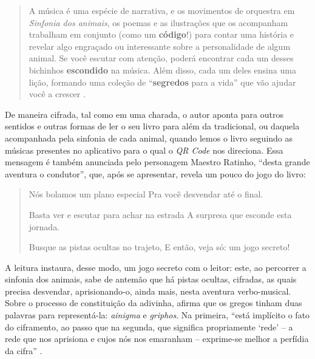 \documentclass[portuguese]{textolivre}
\begin{document}
\begin{quote}
A música é uma espécie de narrativa, e os movimentos de orquestra em
\textit{Sinfonia dos animais}, os poemas e as ilustrações que os acompanham
trabalham em conjunto (como um \textbf{código}!) para contar uma história e
revelar algo engraçado ou interessante sobre a personalidade de algum animal.
Se você escutar com atenção, poderá encontrar cada um desses bichinhos
\textbf{escondido} na música. Além disso, cada um deles ensina uma lição,
formando uma coleção de “\textbf{segredos} para a vida” que vão ajudar você a
crescer \cite[s/p, grifos nossos]{brown_sinfonia_2020}.
\end{quote}

De maneira cifrada, tal como em uma charada, o autor aponta para outros
sentidos e outras formas de ler o seu livro para além da tradicional, ou
daquela acompanhada pela sinfonia de cada animal, quando lemos o livro seguindo
as músicas presentes no aplicativo para o qual o \textit{QR Code} nos
direciona. Essa mensagem é também anunciada pelo personagem Maestro Ratinho,
“desta grande aventura o condutor”, que, após se apresentar, revela um pouco do
jogo do livro:

\begin{quote}
Nós bolamos um plano especial
Pra você desvendar até o final.

Basta ver e escutar para achar na estrada
A surpresa que esconde esta jornada.

Busque as pistas ocultas no trajeto,
E então, veja só: um jogo secreto! \cite[s/p]{brown_sinfonia_2020}
\end{quote}

A leitura instaura, desse modo, um jogo secreto com o leitor: este, ao
percorrer a sinfonia dos animais, sabe de antemão que há pistas ocultas,
cifradas, as quais precisa desvendar, aprisionando-o, ainda mais, nesta
aventura verbo-musical. Sobre o processo de constituição da adivinha,
\textcite{jolles_formas_1976} afirma que os gregos tinham duas palavras para
representá-la: \textit{ainigma} e \textit{griphos}. Na primeira, “está
implícito o fato do ciframento, ao passo que na segunda, que significa
propriamente ‘rede’ – a rede que nos aprisiona e cujos nós nos emaranham –
exprime-se melhor a perfídia da cifra” \cite[p.~123]{jolles_formas_1976}.
\end{document}
